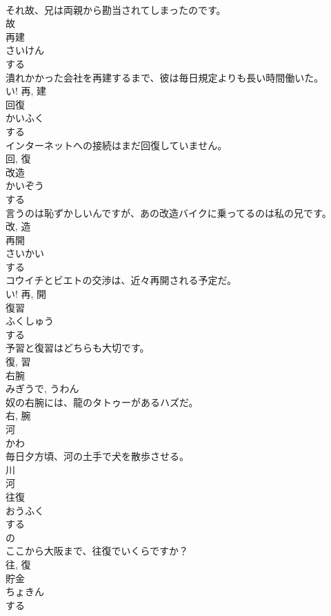 \documentclass[8pt]{extreport}
\begin{document}
\begin{CJK}{UTF8}{min}
\\	それ故、兄は両親から勘当されてしまったのです。	
\\	故	
\\	再建	
\\	さいけん	
\\	する 
\\	潰れかかった会社を再建するまで、彼は毎日規定よりも長い時間働いた。	
\\	い!	再, 建	
\\	回復	
\\	かいふく	
\\	する 
\\	インターネットへの接続はまだ回復していません。	
\\	回, 復	
\\	改造	
\\	かいぞう	
\\	する 
\\	言うのは恥ずかしいんですが、あの改造バイクに乗ってるのは私の兄です。	
\\	改, 造	
\\	再開	
\\	さいかい	
\\	する 
\\	コウイチとビエトの交渉は、近々再開される予定だ。	
\\	い!	再, 開	
\\	復習	
\\	ふくしゅう	
\\	する 
\\	予習と復習はどちらも大切です。	
\\	復, 習	
\\	右腕	
\\	みぎうで, うわん	
\\	奴の右腕には、龍のタトゥーがあるハズだ。	
\\	右, 腕	
\\	河	
\\	かわ	
\\	毎日夕方頃、河の土手で犬を散歩させる。	
\\	川 
\\	河	
\\	往復	
\\	おうふく	
\\	する 
\\	の 
\\	ここから大阪まで、往復でいくらですか？	
\\	往, 復	
\\	貯金	
\\	ちょきん	
\\	する 

\end{CJK}
\end{document}
